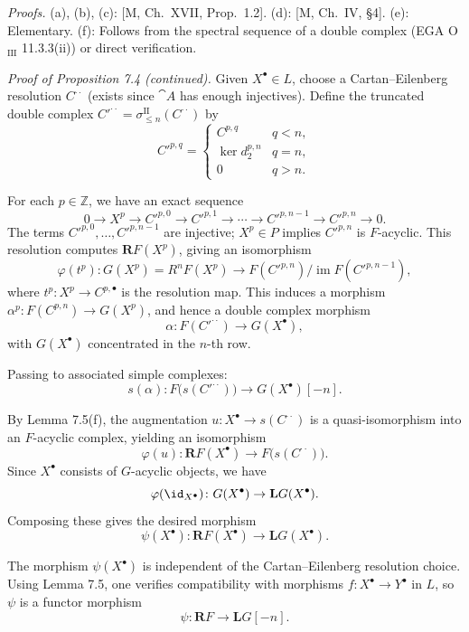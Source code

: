 \textit{Proofs.}
(a), (b), (c): [M, Ch.\ XVII, Prop.\ 1.2].
(d): [M, Ch.\ IV, \S4].
(e): Elementary.
(f): Follows from the spectral sequence of a double complex (EGA O\(_{\mathrm{III}}\) 11.3.3(ii)) or direct verification.

\textit{Proof of Proposition 7.4 (continued).}
Given \(X^\bullet\in L\), choose a Cartan--Eilenberg resolution \(C^{\cdot\cdot}\) (exists since \(\cat{A}\) has enough injectives). Define the truncated double complex \(C'^{\cdot\cdot}=\sigma_{\le n}^\mathrm{II}(C^{\cdot\cdot})\) by
\[
C'^{p,q}=
\begin{cases}
C^{p,q} & q<n,\\
\ker d_2^{p,n} & q=n,\\
0 & q>n.
\end{cases}
\]

\setcounter{page}{78}
For each \(p\in\mathbb{Z}\), we have an exact sequence
\[
0\to X^p\to C'^{p,0}\to C'^{p,1}\to\cdots\to C'^{p,n-1}\to C'^{p,n}\to 0.
\]
The terms \(C'^{p,0},\dots,C'^{p,n-1}\) are injective; \(X^p\in P\) implies \(C'^{p,n}\) is \(F\)-acyclic.
This resolution computes \(\mathbf{R}F(X^p)\), giving an isomorphism
\[
\varphi(t^p)\colon G(X^p)=R^nF(X^p) \to F(C'^{p,n})\big/\operatorname{im}F(C'^{p,n-1}),
\]
where \(t^p\colon X^p\to C^{p,\bullet}\) is the resolution map.
This induces a morphism \(\alpha^p\colon F(C^{p,n})\to G(X^p)\), and hence a double complex morphism
\[
\alpha\colon F(C'^{\cdot\cdot})\to G(X^\bullet),
\]
with \(G(X^\bullet)\) concentrated in the \(n\)-th row.

Passing to associated simple complexes:
\[
s(\alpha)\colon F\big(s(C'^{\cdot\cdot})\big)\to G(X^\bullet)[-n].
\]

\setcounter{page}{79}
By Lemma 7.5(f), the augmentation \(u\colon X^\bullet\to s(C^{\cdot\cdot})\) is a quasi-isomorphism into an \(F\)-acyclic complex, yielding an isomorphism
\[
\varphi(u)\colon \mathbf{R}F(X^\bullet)\to F\big(s(C^{\cdot\cdot})\big).
\]
Since \(X^\bullet\) consists of \(G\)-acyclic objects, we have
\[
\varphi(\id_{X^\bullet})\colon G(X^\bullet)\to \mathbf{L}G(X^\bullet).
\]
Composing these gives the desired morphism
\[
\psi(X^\bullet)\colon \mathbf{R}F(X^\bullet)\to \mathbf{L}G(X^\bullet).
\]

The morphism \(\psi(X^\bullet)\) is independent of the Cartan--Eilenberg resolution choice.
Using Lemma 7.5, one verifies compatibility with morphisms \(f\colon X^\bullet\to Y^\bullet\) in \(L\), so \(\psi\) is a functor morphism
\[
\psi\colon \mathbf{R}F\to \mathbf{L}G[-n].
\]

